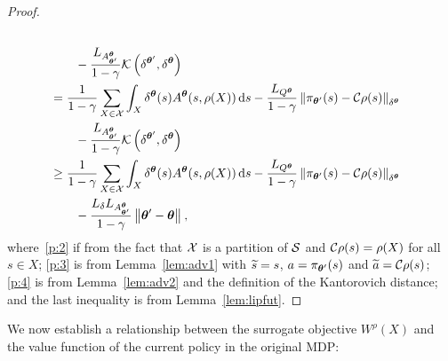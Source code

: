 \begin{proof}
\begin{align}
	\nonumber\\&\qquad-\frac{L_{A^{\vtheta}_{\vtheta'}}}{1-\gamma}\Kant\left(\delta^{\vtheta'},\delta^{\vtheta}\right) \label{p:4}\\
	&=  \frac{1}{1-\gamma}\sum_{X\in\Xspace}\int_{X}\delta^{\vtheta}(s)A^{\vtheta}(s,\rho(X))\de s 
	- \frac{L_{Q^{\vtheta}}}{1-\gamma}\norm[\delta^{\vtheta}]{\pi_{\vtheta'}(s) - \Conc\rho(s)}
	\nonumber\\&\qquad-\frac{L_{A^{\vtheta}_{\vtheta'}}}{1-\gamma}\Kant\left(\delta^{\vtheta'},\delta^{\vtheta}\right) \nonumber\\
	&\geq  \frac{1}{1-\gamma}\sum_{X\in\Xspace}\int_{X}\delta^{\vtheta}(s)A^{\vtheta}(s,\rho(X))\de s 
	- \frac{L_{Q^{\vtheta}}}{1-\gamma}\norm[\delta^{\vtheta}]{\pi_{\vtheta'}(s) - \Conc\rho(s)}
	\nonumber\\&\qquad-\frac{L_{\delta}L_{A^{\vtheta}_{\vtheta'}}}{1-\gamma}\norm{\vtheta'-\vtheta},\nonumber
	\end{align}
	where~\eqref{p:2} if from the fact that $\Xspace$ is a partition of $\Sspace$ and $\Conc\rho (s) = \rho(X)$ for all $s\in X$; \eqref{p:3} is from Lemma~\ref{lem:adv1} with $\wt{s}=s$, $a=\pi_{\vtheta'}(s)$ and $\wt{a}=\Conc\rho(s)$; \eqref{p:4} is from Lemma~\ref{lem:adv2} and the definition of the Kantorovich distance; and the last inequality is from Lemma~\ref{lem:lipfut}.
\end{proof}

We now establish a relationship between the surrogate objective $W^{\rho}(X)$ and the value function of the current policy in the original MDP:


